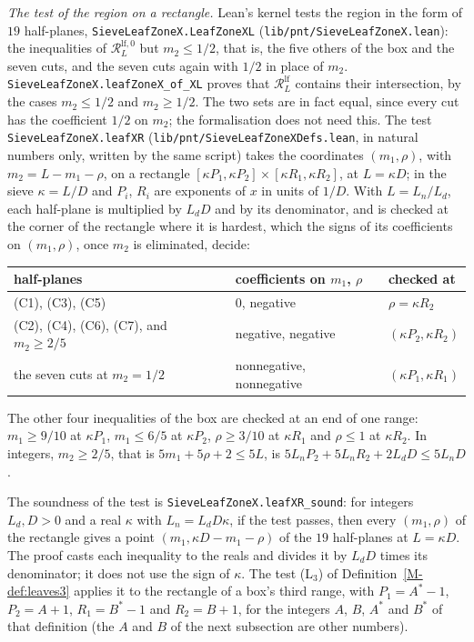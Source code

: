 \documentclass[11pt]{article}
\newcommand{\lean}[1]{\texttt{#1}}
\newcommand{\file}[1]{\nolinkurl{#1}}
\numberwithin{equation}{section}
\begin{document}
\emph{The test of the region on a rectangle.} Lean's kernel tests the region in the form of $19$ half-planes,
\lean{SieveLeafZoneX.\allowbreak LeafZoneXL} (\file{lib/pnt/SieveLeafZoneX.lean}): the inequalities of $\mathcal
R^{\mathrm{lf},0}_L$ but $m_2 \le 1/2$, that is, the five others of the box and the seven cuts, and the seven cuts
again with $1/2$ in place of $m_2$.
\lean{SieveLeafZoneX.\allowbreak leafZoneX\_of\_XL} proves that $\mathcal R^{\mathrm{lf}}_L$ contains their
intersection, by the cases $m_2 \le 1/2$ and $m_2 \ge 1/2$. The two sets are in fact equal, since every cut has the
coefficient $1/2$ on $m_2$; the formalisation does not need this. The test \lean{SieveLeafZoneX.\allowbreak leafXR}
(\file{lib/pnt/SieveLeafZoneXDefs.lean}, in natural numbers only, written by the same script) takes the
coordinates $(m_1, \rho)$, with $m_2 = L - m_1 - \rho$, on a rectangle $[\kappa P_1, \kappa P_2] \times [\kappa R_1,
\kappa R_2]$, at $L = \kappa D$; in the sieve $\kappa = L/D$ and $P_i$, $R_i$ are exponents of $x$ in units of $1/D$.
With $L = L_n/L_d$, each half-plane is multiplied by $L_d D$ and by its denominator, and is checked at the corner of
the rectangle where it is hardest, which the signs of its coefficients on $(m_1, \rho)$, once $m_2$ is eliminated,
decide:
\begin{center}
\small
\begin{tabular}{@{}lll@{}}
\toprule
half-planes & coefficients on $m_1$, $\rho$ & checked at \\
\midrule
(C1), (C3), (C5) & $0$, negative & $\rho = \kappa R_2$ \\
(C2), (C4), (C6), (C7), and $m_2 \ge 2/5$ & negative, negative & $(\kappa P_2, \kappa R_2)$ \\
the seven cuts at $m_2 = 1/2$ & nonnegative, nonnegative & $(\kappa P_1, \kappa R_1)$ \\
\bottomrule
\end{tabular}
\end{center}
The other four inequalities of the box are checked at an end of one range: $m_1 \ge 9/10$ at $\kappa P_1$, $m_1 \le
6/5$ at $\kappa P_2$, $\rho \ge 3/10$ at $\kappa R_1$ and $\rho \le 1$ at $\kappa R_2$. In integers, $m_2 \ge 2/5$, that
is $5m_1 + 5\rho + 2 \le 5L$, is $5L_nP_2 + 5L_nR_2 + 2L_dD \le 5L_nD$.

The soundness of the test is \lean{SieveLeafZoneX.\allowbreak leafXR\_sound}: for integers $L_d, D > 0$ and a real
$\kappa$ with $L_n = L_d D\kappa$, if the test passes, then every $(m_1, \rho)$ of the rectangle gives a point $(m_1,
\kappa D - m_1 - \rho)$ of the $19$ half-planes at $L = \kappa D$. The proof casts each inequality to the reals and
divides it by $L_d D$ times its denominator; it does not use the sign of $\kappa$. The test (L$_3$) of
Definition~\ref{M-def:leaves3} applies it to the rectangle of a box's third range, with $P_1 = A^* - 1$, $P_2 = A +
1$, $R_1 = B^* - 1$ and $R_2 = B + 1$, for the integers $A$, $B$, $A^*$ and $B^*$ of that definition (the $A$ and $B$
of the next subsection are other numbers).
\end{document}
